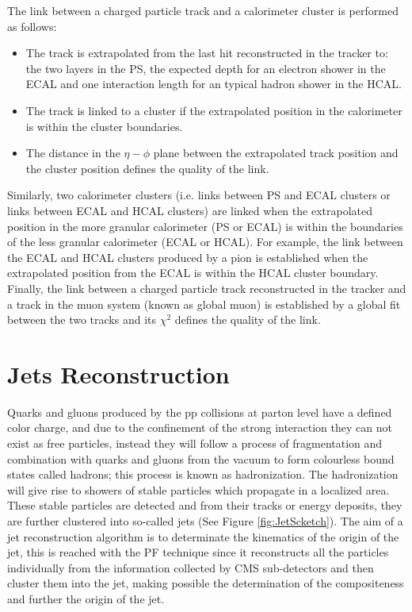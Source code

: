 The link between a charged particle track and a calorimeter cluster is performed as follows:

\begin{itemize}
 \item The track is extrapolated from the last hit reconstructed in the tracker to: the two layers in the PS, the expected depth
 for an electron shower in the ECAL and one interaction length for an typical hadron shower in the HCAL. 
 \item The track is linked to a cluster if the extrapolated position in the calorimeter is within the cluster boundaries. 
 \item The distance in the $\eta-\phi$ plane between the extrapolated track position and the cluster position defines the quality of the link. 
\end{itemize}

Similarly, two calorimeter clusters (i.e. links between PS and ECAL clusters or links between ECAL and HCAL clusters) are linked when the 
extrapolated position in the more granular calorimeter (PS or ECAL) is within 
the boundaries of the less granular calorimeter (ECAL or HCAL). For example, the link between the ECAL and HCAL clusters
produced by a pion is established when the extrapolated position from the ECAL is within the HCAL cluster boundary. Finally, the 
link between a charged particle track reconstructed in the tracker and a track in the muon system (known as global muon) 
is established by a global fit between the two tracks and its $\chi^{2}$ defines the quality of the link.  

\section{Jets Reconstruction}
\label{sec:Jet}

Quarks and gluons produced by the pp collisions at parton level have a defined color charge, and 
due to the confinement of the strong interaction they can not exist as free particles, instead they 
will follow a process of fragmentation and combination with quarks and gluons from the vacuum to form 
colourless bound states called hadrons; this process is known as hadronization. The hadronization will 
give rise to showers of stable particles which propagate in a localized area. These stable particles 
are detected and from their tracks or energy deposits, they are further clustered into so-called jets (See Figure \ref{fig:JetScketch}). The aim 
of a jet reconstruction algorithm is to determinate the kinematics of the origin of the jet, this is reached with the PF 
technique since it reconstructs all the particles individually from the information collected by CMS sub-detectors
and then cluster them into the jet, making possible the determination of the compositeness and further the origin of the jet.\\


